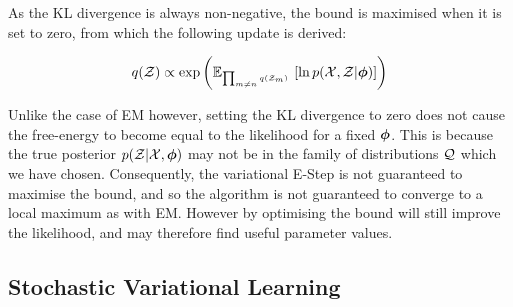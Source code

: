 As the KL divergence is always non-negative, the bound is maximised when it is set to zero, from which the following update is derived: 

\begin{align*}
q({ \mathcal{Z} }) \propto \exp\left( { \mathbb{E}_{ { {{ \mbox{\tiny ${\prod_{m\neq n} q({ \mathcal{Z} }_m)}$ } }} } }\left[ { \ln { p( { \mathcal{X} } ,  { \mathcal{Z} } |  {  \bm \phi  } ) } } \right] }  \right)
\end{align*}

Unlike the case of EM however, setting the KL divergence to zero does not cause the free-energy to become equal to the likelihood for a fixed ${ \bm \phi }$. This is because the true posterior $p({ \mathcal{Z} } | { \mathcal{X} }, { \bm \phi })$ may not be in the family of distributions ${ \mathcal{Q} }$ which we have chosen. Consequently, the variational E-Step is not guaranteed to maximise the bound, and so the algorithm is not guaranteed to converge to a local maximum as with EM. However by optimising the bound will still improve the likelihood, and may therefore find useful parameter values.

\subsection{Stochastic Variational Learning}


